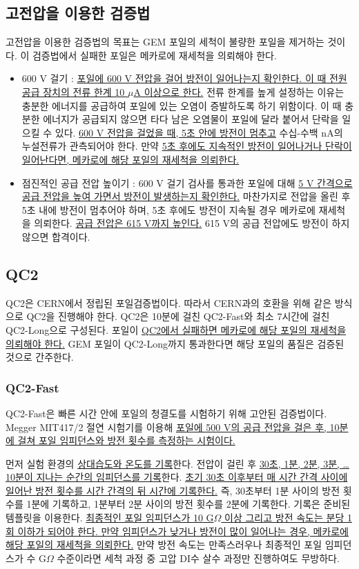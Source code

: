 \documentclass[11pt]{article}
\begin{document}
\subsection{고전압을 이용한 검증법}
고전압을 이용한 검증법의 목표는 GEM 포일의 세척이 불량한 포일을 제거하는 것이다. 이 검증법에서 실패한 포일은 메카로에 재세척을 의뢰해야 한다.

\begin{itemize}
\item 600 V 걸기 : \uline{포일에 600 V 전압을 걸어 방전이 일어나는지 확인한다. 이 때 전원 공급 장치의 전류 한계 10 $\mu$A 이상으로 한다.} 전류 한계를 높게 설정하는 이유는 충분한 에너지를 공급하여 포일에 있는 오염이 증발하도록 하기 위함이다. 이 때 충분한 에너지가 공급되지 않으면 타다 남은 오염물이 포일에 달라 붙어서 단락을 일으킬 수 있다. \uline{600 V 전압을 걸었을 때, 5초 안에 방전이 멈추고} 수십-수백 nA의 누설전류가 관측되어야 한다. 만약 \uline{5초 후에도 지속적인 방전이 일어나거나 단락이 일어난다면, 메카로에 해당 포일의 재세척을 의뢰한다.}
\item 점진적인 공급 전압 높이기 : 600 V 걸기 검사를 통과한 포일에 대해 \uline{5 V 간격으로 공급 전압을 높여 가면서 방전이 발생하는지 확인한다.} 마찬가지로 전압을 올린 후 5초 내에 방전이 멈추어야 하며, 5초 후에도 방전이 지속될 경우 메카로에 재세척을 의뢰한다. \uline{공급 전압은 615 V까지 높인다.} 615 V의 공급 전압에도 방전이 하지 않으면 합격이다.
\end{itemize}

\subsection{QC2}
QC2은 CERN에서 정립된 포일검증법이다. 따라서 CERN과의 호환을 위해 같은 방식으로 QC2을 진행해야 한다. QC2은 10분에 걸친 QC2-Fast와 최소 7시간에 걸친 QC2-Long으로 구성된다. 포일이 \uline{QC2에서 실패하면 메카로에 해당 포일의 재세척을 의뢰해야 한다.} GEM 포일이 QC2-Long까지 통과한다면 해당 포일의 품질은 검증된 것으로 간주한다.

\subsubsection{QC2-Fast}
QC2-Fast은 빠른 시간 안에 포일의 청결도를 시험하기 위해 고안된 검증법이다. Megger MIT417/2 절연 시험기를 이용해 \uline{포일에 500 V의 공급 전압을 걸은 후, 10분에 걸쳐 포일 임피던스와 방전 횟수를 측정하는 시험이다.}

먼저 실험 환경의 \uline{상대습도와 온도를 기록}한다. 전압이 걸린 후 \uline{30초, 1분, 2분, 3분, \dots 10분이 지나는 순간의 임피던스를 기록}한다. \uline{초기 30초 이후부터 매 시간 간격 사이에 일어난 방전 횟수를 시간 간격의 뒤 시간에 기록한다.} 즉, 30초부터 1분 사이의 방전 횟수를 1분에 기록하고, 1분부터 2분 사이의 방전 횟수를 2분에 기록한다. 기록은 준비된 템플릿을 이용한다. \uline{최종적인 포일 임피던스가 10 G$\Omega$ 이상 그리고 방전 속도는 분당 1회 이하가 되어야 한다. 만약 임피던스가 낮거나 방전이 많이 일어나는 경우, 메카로에 해당 포일의 재세척을 의뢰한다.} 만약 방전 속도는 만족스러우나 최종적인 포일 임피던스가 수 G$\Omega$ 수준이라면 세척 과정 중 고압 DI수 살수 과정만 진행하여도 무방하다.     
\end{document}
